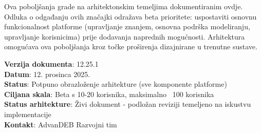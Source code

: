 \documentclass[12pt,a4paper]{article}
\begin{document}
Ova poboljšanja grade na arhitektonskim temeljima dokumentiranim ovdje. Odluka o odgađanju ovih značajki odražava beta prioritete: uspostaviti osnovnu funkcionalnost platforme (upravljanje znanjem, osnovna podrška modeliranju, upravljanje korisnicima) prije dodavanja naprednih mogućnosti. Arhitektura omogućava ova poboljšanja kroz točke proširenja dizajnirane u trenutne sustave.

\vspace{1cm}

\noindent\textbf{Verzija dokumenta}: 12.25.1\\
\textbf{Datum}: 12. prosinca 2025.\\
\textbf{Status}: Potpuno obrazloženje arhitekture (sve komponente platforme)\\
\textbf{Ciljana skala}: Beta s 10-20 korisnika, maksimalno ~100 korisnika\\
\textbf{Status arhitekture}: Živi dokument - podložan reviziji temeljeno na iskustvu implementacije\\
\textbf{Kontakt}: AdvanDEB Razvojni tim
\end{document}
